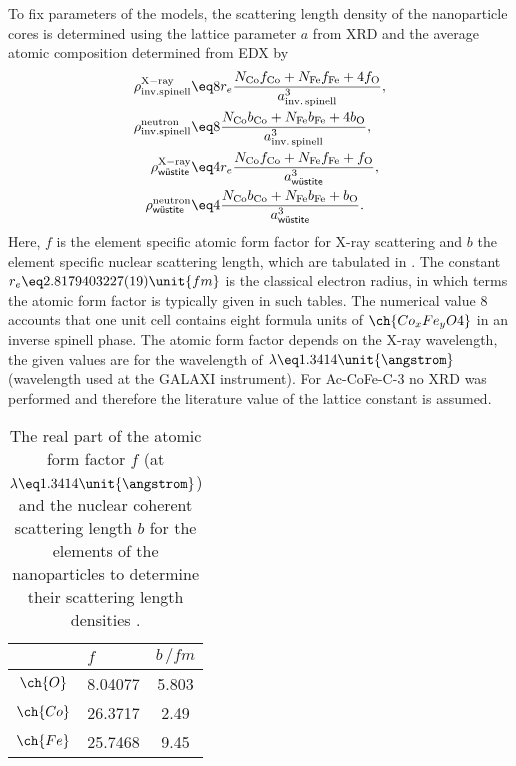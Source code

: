 \documentclass[\main/dresen_thesis.tex]{subfiles}
\begin{document}
    To fix parameters of the models, the scattering length density of the nanoparticle cores is determined using the lattice parameter $a$ from XRD and the average atomic composition determined from EDX by
    \begin{align}
      \label{eq:monolayer:charMethod:calcSLD}
      \rho^\mathrm{X-ray}_\mathrm{inv. spinell}   &\eq 8 r_e \frac{N_\mathrm{Co} f_\mathrm{Co} + N_\mathrm{Fe} f_\mathrm{Fe} + 4 f_\mathrm{O}}
                                                                  {a_\mathrm{inv.\,spinell}^3},\\
      \rho^\mathrm{neutron}_\mathrm{inv. spinell} &\eq 8 \frac{N_\mathrm{Co} b_\mathrm{Co} + N_\mathrm{Fe} b_\mathrm{Fe} + 4 b_\mathrm{O}}
                                                                  {a_\mathrm{inv.\,spinell}^3},\\
      \rho^\mathrm{X-ray}_\textsf{w\"ustite}      &\eq 4 r_e \frac{N_\mathrm{Co} f_\mathrm{Co} + N_\mathrm{Fe} f_\mathrm{Fe} + f_\mathrm{O}}
                                                                  {a_\textsf{w\"ustite}^3},\\
      \rho^\mathrm{neutron}_\textsf{w\"ustite}    &\eq 4 \frac{N_\mathrm{Co} b_\mathrm{Co} + N_\mathrm{Fe} b_\mathrm{Fe} + b_\mathrm{O}}
                                                              {a_\textsf{w\"ustite}^3}.
    \end{align}
    Here, $f$ is the element specific atomic form factor for X-ray scattering and $b$ the element specific nuclear scattering length, which are  tabulated in  \cite{Sears_1992_Neutr, BerkeleyLab_1993_asf}.
    The constant $r_e \eq 2.8179403227(19) \unit{fm}$ is the classical electron radius, in which terms the atomic form factor is typically given in such tables.
    The numerical value $8$ accounts that one unit cell contains eight formula units of $\ch{Co_xFe_yO4}$ in an inverse spinell phase.
    The atomic form factor depends on the X-ray wavelength, the given values are for the wavelength of $\lambda \eq 1.3414 \unit{\angstrom}$ (wavelength used at the GALAXI instrument).
    For Ac-CoFe-C-3 no XRD was performed and therefore the literature value of the lattice constant is assumed.
    \begin{table}[ht]
      \centering
      \caption{\label{tab:monolayers:charMethod:scatteringLenghts}The real part of the atomic form factor $f$ (at $\lambda \eq 1.3414 \unit{\angstrom}$) and the nuclear coherent scattering length $b$ for the elements of the nanoparticles to determine their scattering length densities \cite{Sears_1992_Neutr, BerkeleyLab_1993_asf}.}
      \begin{tabular}{ c | l | c }
                  & $f$       & $b \, / \unit{fm}$ \\
        \hline
        $\ch{O}$  & 8.04077   & 5.803   \\
        $\ch{Co}$ & 26.3717   & 2.49  \\
        $\ch{Fe}$ & 25.7468   & 9.45  \\
        \hline
      \end{tabular}
    \end{table}
\end{document}

